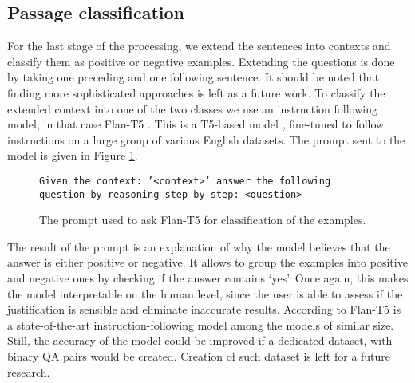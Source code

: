 \subsection{Passage classification}

For the last stage of the processing, we extend the sentences into contexts and classify them as positive or negative examples. 
Extending the questions is done by taking one preceding and one following sentence. It should be noted that finding more sophisticated approaches is left as a future work.
To classify the extended 
context into one of the two classes we use an instruction following model, in that case Flan-T5 \cite{chung2022scaling}. 
This is a T5-based model \cite{raffel2020exploring}, fine-tuned to follow instructions on a large group of various
English datasets. The prompt sent to the model is given in Figure \ref{fig:flan-instruction}.

\begin{figure}[htbp]
  \texttt{Given the context: '<context>' answer the following question by reasoning step-by-step: <question>} 
  \caption{The prompt used to ask Flan-T5 for classification of the examples.}
  \label{fig:flan-instruction}
\end{figure}

The result of the prompt is an explanation of why the model believes that the answer is either positive or negative.
It allows to group the examples into positive and negative ones by checking if the answer contains `yes'. Once again, this makes the model
interpretable on the human level, since the user is able to assess if the justification is sensible and eliminate inaccurate results. 
According to \cite{chia2023instructeval} Flan-T5 is a state-of-the-art instruction-following model among the models of similar size.
Still, the accuracy of the model could be improved if a dedicated dataset, with binary QA pairs would be created. Creation of such dataset is left for a future research.

